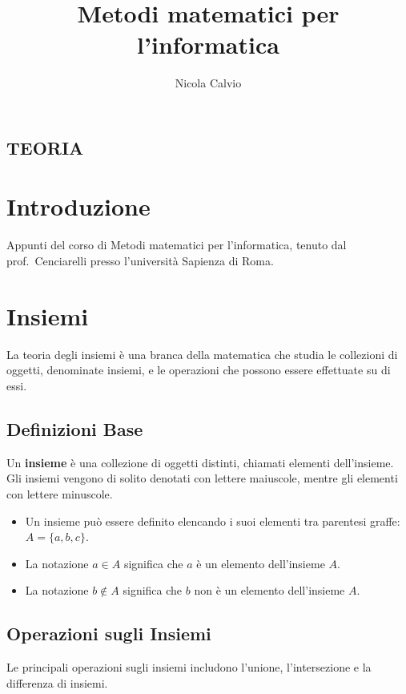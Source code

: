 \documentclass{article}
\title{Metodi matematici per l'informatica}
\author{Nicola Calvio}
\begin{document}
\maketitle

\begin{center}
    \section*{TEORIA}
\end{center}

\section{Introduzione}

Appunti del corso di Metodi matematici per l'informatica, tenuto dal prof.~Cenciarelli presso l'università Sapienza di Roma.

\section{Insiemi}

La teoria degli insiemi è una branca della matematica che studia le collezioni di oggetti, denominate insiemi, e le operazioni che possono essere effettuate su di essi.

\subsection{Definizioni Base}
Un \textbf{insieme} è una collezione di oggetti distinti, chiamati elementi dell'insieme. Gli insiemi vengono di solito denotati con lettere maiuscole, mentre gli elementi con lettere minuscole.

\begin{itemize}
    \item Un insieme può essere definito elencando i suoi elementi tra parentesi graffe: $A = \{a, b, c\}$.
    \item La notazione $a \in A$ significa che $a$ è un elemento dell'insieme $A$.
    \item La notazione $b \notin A$ significa che $b$ non è un elemento dell'insieme $A$.
\end{itemize}

\subsection{Operazioni sugli Insiemi}
Le principali operazioni sugli insiemi includono l'unione, l'intersezione e la differenza di insiemi.
\end{document}
